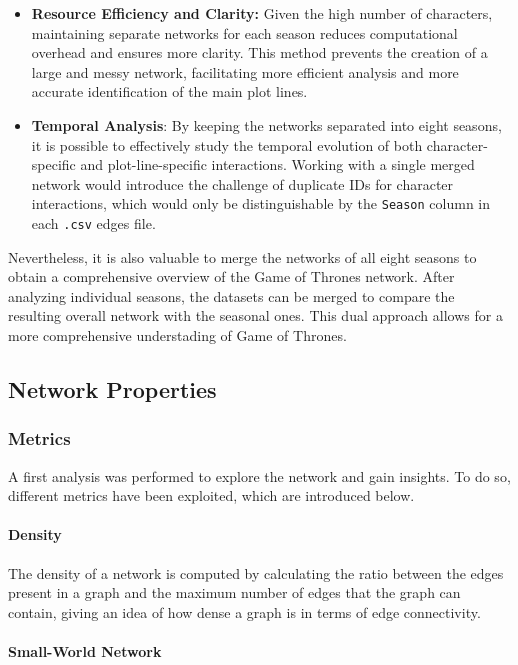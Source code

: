 \documentclass[10pt,twocolumn,letterpaper]{article}
\begin{document}
\begin{itemize}
    \item \textbf{Resource Efficiency and Clarity:} Given the high number of characters, maintaining separate networks for each season reduces computational overhead and ensures more clarity. This method prevents the creation of a large and messy network, facilitating more efficient analysis and more accurate identification of the main plot lines.

    \item \textbf{Temporal Analysis}: By keeping the networks separated into eight seasons, it is possible to effectively study the temporal evolution of both character-specific and plot-line-specific interactions. Working with a single merged network would introduce the challenge of duplicate IDs for character interactions, which would only be distinguishable by the \texttt{Season} column in each \texttt{.csv} edges file.
\end{itemize}

Nevertheless, it is also valuable to merge the networks of all eight seasons to obtain a comprehensive overview of the Game of Thrones network. After analyzing individual seasons, the datasets can be merged to compare the resulting overall network with the seasonal ones. This dual approach allows for a more comprehensive understading of Game of Thrones.

\subsection{Network Properties}

\subsubsection{Metrics}

A first analysis was performed to explore the network and gain insights. To do so, different metrics have been exploited, which are introduced below.

\paragraph{Density}

The density of a network is computed by calculating the ratio between the edges present in a graph and the maximum number of edges that the graph can contain, giving an idea of how dense a graph is in terms of edge connectivity. 

\paragraph{Small-World Network}
\end{document}

